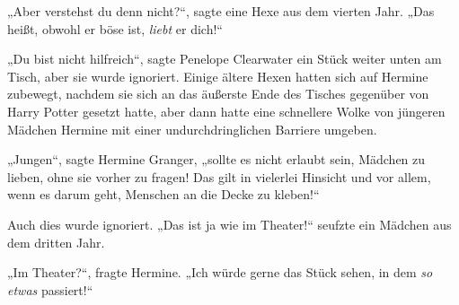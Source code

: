„Aber verstehst du denn nicht?“, sagte eine Hexe aus dem vierten Jahr. „Das heißt, obwohl er böse ist, \emph{liebt} er dich!“

„Du bist nicht hilfreich“, sagte Penelope Clearwater ein Stück weiter unten am Tisch, aber sie wurde ignoriert. Einige ältere Hexen hatten sich auf Hermine zubewegt, nachdem sie sich an das äußerste Ende des Tisches gegenüber von Harry Potter gesetzt hatte, aber dann hatte eine schnellere Wolke von jüngeren Mädchen Hermine mit einer undurchdringlichen Barriere umgeben.

„Jungen“, sagte Hermine Granger, „sollte es nicht erlaubt sein, Mädchen zu lieben, ohne sie vorher zu fragen! Das gilt in vielerlei Hinsicht und vor allem, wenn es darum geht, Menschen an die Decke zu kleben!“

Auch dies wurde ignoriert. „Das ist ja wie im Theater!“ seufzte ein Mädchen aus dem dritten Jahr.

„Im Theater?“, fragte Hermine. „Ich würde gerne das Stück sehen, in dem \emph{so etwas} passiert!“


